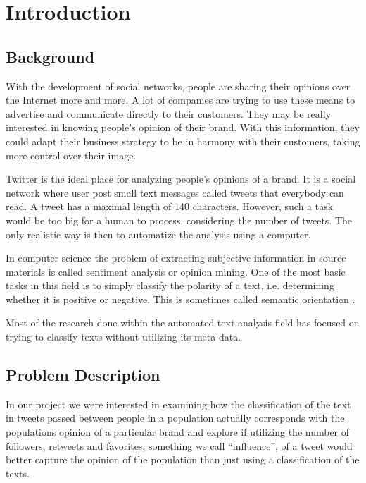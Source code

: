 \documentclass[a4paper,12pt]{report}
\begin{document}
\tableofcontents

\clearpage
\chapter{Introduction}

\section{Background}
With the development of social networks, people are sharing their opinions over the Internet more and more.
A lot of companies are trying to use these means to advertise and communicate directly to their customers.
They may be really interested in knowing people's opinion of their brand.
With this information, they could adapt their business strategy to be in harmony with their customers, taking more control over their image.

Twitter \cite{Twitter} is the ideal place for analyzing people's opinions of a brand. 
It is a social network where user post small text messages called tweets that everybody can read. 
A tweet has a maximal length of 140 characters. However, such a task would be too big for a human to process, considering the number of tweets.
The only realistic way is then to automatize the analysis using a computer.

In computer science the problem of extracting subjective information in source materials is called sentiment analysis or opinion mining. 
One of the most basic tasks in this field is to simply classify the polarity of a text, i.e. determining whether it is positive or negative. 
This is sometimes called semantic orientation \cite{SenWiki}. 

Most of the research done within the automated text-analysis field has focused on trying to classify texts without utilizing its meta-data.

\section{Problem Description}

In our project we were interested in examining how the classification of the text in tweets passed between people in a population actually corresponds with the populations opinion of a particular brand and explore if utilizing the number of followers, retweets and favorites, something we call ``influence'', of a tweet would better capture the opinion of the population than just using a classification of the texts. 
\end{document}
